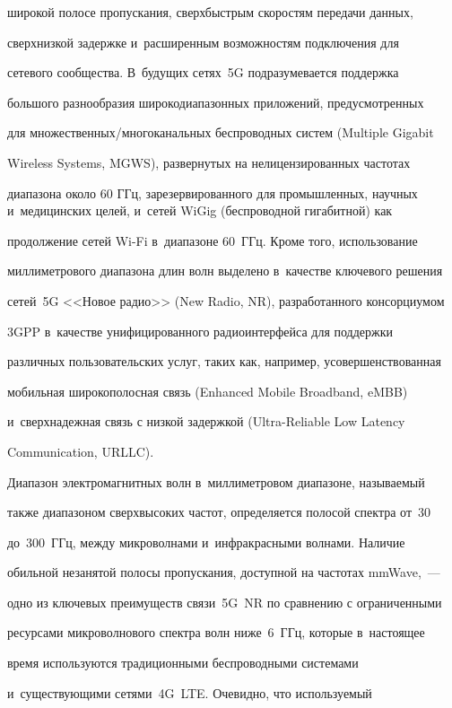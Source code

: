 широкой полосе пропускания, сверхбыстрым скоростям передачи данных, 


сверхнизкой задержке и~расширенным возможностям подключения для 


сетевого сообщества. В~будущих сетях~5G подразумевается поддержка 


большого разнообразия широкодиапазонных приложений, предусмотренных 


для множественных/многоканальных беспроводных систем (Multiple Gigabit 


Wireless Systems, MGWS), развернутых на нелицензированных частотах 


диапазона около 60 ГГц, зарезервированного для промышленных, научных и~медицинских целей, и~сетей WiGig (беспроводной гигабитной) как 


продолжение сетей Wi-Fi в~диапазоне 60~ГГц. Кроме того, использование 


миллиметрового диапазона длин волн выделено в~качестве ключевого решения 


сетей~5G <<Новое радио>> (New Radio, NR), разработанного консорциумом 


3GPP в~качестве унифицированного радиоинтерфейса для поддержки 


различных пользовательских услуг, таких как, например, усовершенствованная 


мобильная широкополосная связь (Enhanced Mobile Broadband, eMBB) 


и~сверхнадежная связь с низкой задержкой (Ultra-Reliable Low Latency 


Communication, URLLC). 


  


  Диапазон электромагнитных волн в~миллиметровом диапазоне, называемый 


также диапазоном сверхвысоких частот, определяется полосой спектра от~30 


до~300~ГГц, между микроволнами и~инфракрасными волнами. Наличие 


обильной незанятой полосы пропускания, доступной на частотах mmWave,~--- 


одно из ключевых преимуществ связи~5G~NR по сравнению с ограниченными 


ресурсами микроволнового спектра волн ниже~6~ГГц, которые в~настоящее 


время используются традиционными беспроводными системами 


и~существующими сетями~4G~LTE. Очевидно, что используемый 


